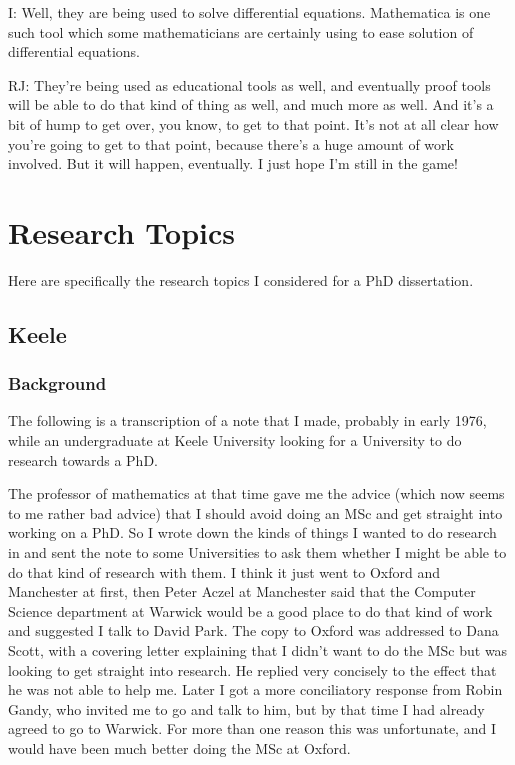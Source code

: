 \documentclass[10pt,titlepage]{book}
\begin{document}
I: Well, they are being used to solve differential equations.
Mathematica is one such tool which some mathematicians are certainly using to ease solution of differential equations.

RJ: They're being used as educational tools as well, and eventually proof tools will be able to do that kind of thing as well, and much more as well.
And it's a bit of hump to get over, you know, to get to that point.
It's not at all clear how you're going to get to that point, because there's a huge amount of work involved.
But it will happen, eventually.
I just hope I'm still in the game!

\chapter{Research Topics}\label{ResearchTopics}

Here are specifically the research topics I considered for a PhD dissertation.

\section{Keele}\label{KeeleProposal}

\subsection{Background}

The following is a transcription of a note that I made, probably in early 1976, while an undergraduate at Keele University looking for a University to do research towards a PhD.

The professor of mathematics at that time gave me the advice (which now seems to me rather bad advice) that I should avoid doing an MSc and get straight into working on a PhD.
So I wrote down the kinds of things I wanted to do research in and sent the note to some Universities to ask them whether I might be able to do that kind of research with them.
I think it just went to Oxford and Manchester at first, then Peter Aczel at Manchester said that the Computer Science department at Warwick would be a good place to do that kind of work and suggested I talk to David Park.
The copy to Oxford was addressed to Dana Scott, with a covering letter explaining that I didn't want to do the MSc but was looking to get straight into research.
He replied very concisely to the effect that he was not able to help me.
Later I got a more conciliatory response from Robin Gandy, who invited me to go and talk to him, but by that time I had already agreed to go to Warwick.
For more than one reason this was unfortunate, and I would have been much better doing the MSc at Oxford.
\end{document}
